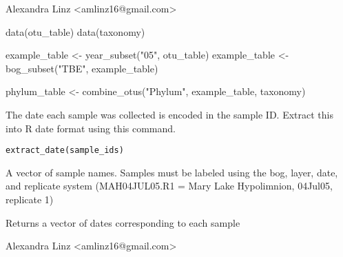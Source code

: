 \documentclass[a4paper]{book}
\begin{document}
%
\begin{Author}\relax
Alexandra Linz <amlinz16@gmail.com>
\end{Author}
%
\begin{Examples}
\begin{ExampleCode}

data(otu_table)
data(taxonomy)

example_table <- year_subset("05", otu_table)
example_table <- bog_subset("TBE", example_table)

phylum_table <- combine_otus("Phylum", example_table, taxonomy)

\end{ExampleCode}
\end{Examples}
%
\begin{Description}\relax
The date each sample was collected is encoded in the sample ID. Extract this into R date format using this command. 
\end{Description}
%
\begin{Usage}
\begin{verbatim}
extract_date(sample_ids)
\end{verbatim}
\end{Usage}
%
\begin{Arguments}
\begin{ldescription}
\item[\code{sample\_ids}] 
A vector of sample names. Samples must be labeled using the bog, layer, date, and replicate system (MAH04JUL05.R1 = Mary Lake Hypolimnion, 04Jul05, replicate 1)

\end{ldescription}
\end{Arguments}
%
\begin{Value}
Returns a vector of dates corresponding to each sample
\end{Value}
%
\begin{Author}\relax
Alexandra Linz <amlinz16@gmail.com>
\end{Author}
%
\begin{Examples}
\end{Examples}
\end{document}
